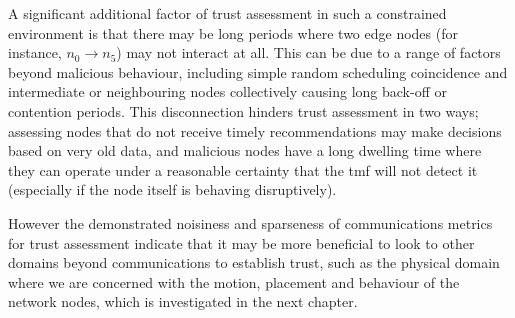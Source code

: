 A significant additional factor of trust assessment in such a constrained environment is that there may be long periods where two edge nodes (for instance, $n_0 \to n_5$) may not interact at all. 
This can be due to a range of factors beyond malicious behaviour, including simple random scheduling coincidence and intermediate or neighbouring nodes collectively causing long back-off or contention periods.
This disconnection hinders trust assessment in two ways; assessing nodes that do not receive timely recommendations may make decisions based on very old data, and malicious nodes have a long dwelling time where they can operate under a reasonable certainty that the \gls{tmf} will not detect it (especially if the node itself is behaving disruptively).

However the demonstrated noisiness and sparseness of communications metrics for trust assessment indicate that it may be more beneficial to look to other domains beyond communications to establish trust, such as the physical domain where we are concerned with the motion, placement and behaviour of the network nodes, which is investigated in the next chapter.
